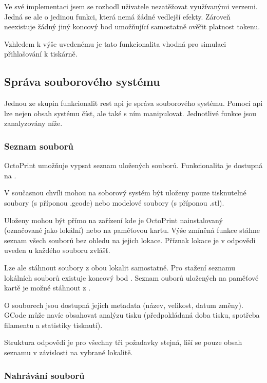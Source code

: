 Ve své implementaci jsem se rozhodl uživatele nezatěžovat využívanými verzemi.
Jedná se ale o jedinou funkci, která nemá žádné vedlejší efekty.
Zároveň neexistuje žádný jiný koncový bod umožňující samostatně ověřit platnost tokenu.

Vzhledem k výše uvedenému je tato funkcionalita vhodná pro simulaci přihlašování k tiskárně.

\subsection{Správa souborového systému}

Jednou ze skupin funkcionalit \acrshort{rest} \acrshort{api} je správa souborového systému.
Pomocí \acrshort{api} lze nejen obsah systému číst, ale také s ním manipulovat.
Jednotlivé funkce jsou zanalyzovány níže.

\subsubsection*{Seznam souborů}

OctoPrint umožňuje vypsat seznam uložených souborů.
Funkcionalita je dostupná na .

V současnou chvíli mohou na soborový systém být uloženy pouze tisknutelné soubory (s příponou .gcode) nebo modelové soubory (s příponou .stl).

Uloženy mohou být přímo na zařízení kde je OctoPrint nainstalovaný (označované jako lokální) nebo na paměťovou kartu.
Výše zmíněná funkce stáhne seznam všech souborů bez ohledu na jejich lokace.
Příznak lokace je v odpovědi uveden u každého souboru zvlášť.

Lze ale stáhnout soubory z obou lokalit samostatně.
Pro stažení seznamu lokálních souborů existuje koncový bod .
Seznam ouborů uložených na paměťové kartě je možné stáhnout z .

O souborech jsou dostupná jejich metadata (název, velikost, datum změny).
GCode může navíc obsahovat analýzu tisku (předpokládaná doba tisku, spotřeba filamentu a statistiky tisknutí).

Struktura odpovědí je pro všechny tři požadavky stejná, liší se pouze obsah seznamu v závislosti na vybrané lokalitě.

\subsubsection*{Nahrávání souborů}

